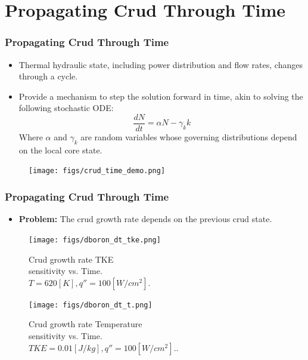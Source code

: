 \documentclass[t, pdftex]{beamer}
\begin{document}
\section[Time Stepping]{Propagating Crud Through Time}
\begin{frame}
\frametitle{Propagating Crud Through Time}
\vspace{-16pt}
\begin{itemize}
    \item Thermal hydraulic state, including power distribution and flow rates, changes through a cycle.  
    \item Provide a mechanism to step the solution forward in time, akin to solving the following stochastic ODE:
    \[
    \frac{d N}{d t} = \alpha N - \gamma_k k
    \]
    Where $\alpha$ and $\gamma_k$ are random variables whose governing distributions depend on the local core state.
\end{itemize}

\begin{figure}[]
\centering
\texttt{[image: figs/crud\_time\_demo.png]}
\label{model_overview}
\end{figure}
\end{frame}


\begin{frame}[shrink=10]
\frametitle{Propagating Crud Through Time}
\begin{itemize}
\item  \textbf{Problem:}  The crud growth rate depends on the previous crud state. 
\end{itemize}
\begin{figure}[!htbp]
\centering
\begin{minipage}{.5\textwidth}
  \texttt{[image: figs/dboron\_dt\_tke.png]}
\caption{\centering Crud growth rate TKE \\ sensitivity vs. Time. \\ $T=620[K], q''=100[W/cm^2]$.} 
\label{fig:crud_pre_map}
\end{minipage}%
\begin{minipage}{.5\textwidth}
  \texttt{[image: figs/dboron\_dt\_t.png]}
\caption{\centering Crud growth rate Temperature \\ sensitivity vs. Time. \\ $TKE=0.01[J/kg], q''=100[W/cm^2]$..}
\label{fig:crud_post_map}
\end{minipage}
\end{figure}
\end{frame}
\end{document}
